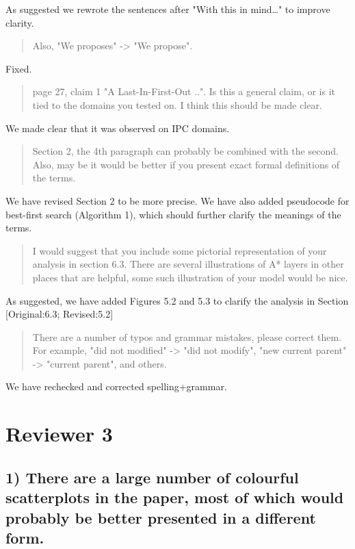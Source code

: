 \documentclass{article}
\begin{document}
As suggested we rewrote the sentences after "With this in mind\ldots{}" to improve clarity.

\begin{quote}
Also, "We proposes" -> "We propose".
\end{quote}

Fixed.

\begin{quote}
 page 27, claim 1 "A Last-In-First-Out ..". Is this a general claim,
or is it tied to the domains you tested on. I think this should be
made clear.
\end{quote}

We made clear that it was observed on IPC domains.

\begin{quote}
 Section 2, the 4th paragraph can probably be combined with the
second. Also, may be it would be better if you present exact formal
definitions of the terms.
\end{quote}

We have revised Section 2 to be more precise.
We have also added pseudocode for best-first search (Algorithm 1), which should further clarify the meanings of the terms.

\begin{quote}
 I would suggest that you include some pictorial representation of
your analysis in section 6.3. There are several illustrations of A*
layers in other places that are helpful, some such illustration of
your model would be nice.
\end{quote}

As suggested, we have added Figures 5.2 and 5.3 to clarify the analysis in Section [Original:6.3; Revised:5.2]

\begin{quote}
 There are a number of typos and grammar mistakes, please correct
them. For example, "did not modified" -> "did not modify", "new
current parent" -> "current parent", and others.
\end{quote}

We have rechecked and corrected spelling+grammar.
\section{Reviewer 3}
\label{sec:orgheadline34}

\subsection{1) There are a large number of colourful scatterplots in the paper, most of which would probably be better presented in a different form.}
\label{sec:orgheadline26}
\end{document}
